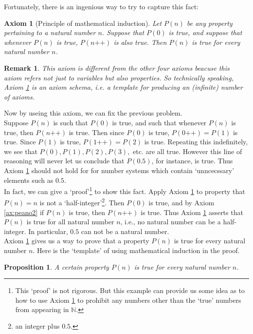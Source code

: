 \documentclass[a4paper]{book}
\newtheorem{axiom}{Axiom}[chapter]
\newtheorem{remark}{Remark}[section]
\newtheorem{proposition}{Proposition}[section]
\begin{document}
			Fortunately, there is an ingenious way to try to capture this fact:
			\begin{axiom}[Principle of mathematical induction]
				\label{ax:peano5}
				Let $P(n)$ be any property pertaining to a natural number $n$. Suppose that $P(0)$ is true, and suppose that whenever $P(n)$ is true, $P(n\texttt{++})$ is also true. Then $P(n)$ is true for every natural number $n$.
      \end{axiom}
			\begin{remark}
				This axiom is different from the other four axioms beacuse this axiom refers not just to \textit{variables} but also \textit{properties}. So technically speaking, Axiom \ref{ax:peano5} is an \textit{axiom schema}, i.e. a template for producing an (infinite) number of axioms.
			\end{remark}
			Now by useing this axiom, we can fix the previous problem.\\
			Suppose $P(n)$ is such that $P(0)$ is true, and such that whenever $P(n)$ is true, then $P(n \texttt{++})$ is true. Then since $P(0)$ is true, $P(0 \texttt{++}) = P(1)$ is true. Since $P(1)$ is true, $P(1 \texttt{++}) = P(2)$ is true. Repeating this indefinitely, we see that $P(0), P(1), P(2), P(3),$ etc. are all true. However this line of reasoning will never let us conclude that $P(0.5)$, for instance, is true. Thus Axiom \ref{ax:peano5} should not hold for for number systems which contain `unncecssary' elements such as $0.5$.\\
			In fact, we can give a `proof'\footnote{This `proof' is not rigorous. But this example can provide us some idea as to how to use Axiom \ref{ax:peano5} to prohibit any numbers other than the `true' numbers from appearing in $\mathbb{N}$.} to show this fact. Apply Axiom \ref{ax:peano5} to property that $P(n)= n$ is not a `half-integer'\footnote{an integer plus $0.5$.}. Then $P(0)$ is true, and by Axiom \ref{ax:peano2} if $P(n)$ is true, then $P(n\texttt{++})$ is true. Thus Axiom \ref{ax:peano5} asserts that $P(n)$ is true for all natural number $n$, i.e., no natural number can be a half-integer. In particular, $0.5$ can not be a natural number.\\
			Axiom \ref{ax:peano5} gives us a way to prove that a property $P(n)$ is true for every natural number $n$. Here is the `template' of using mathematical induction in the proof.
			\begin{proposition}
				A certain property $P(n)$ is true for every natural number $n$.
			\end{proposition}
\end{document}
